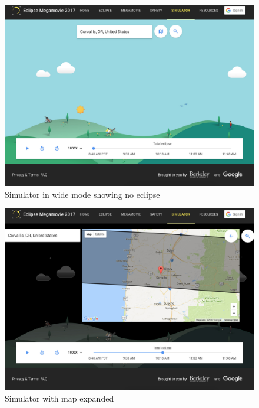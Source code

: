 \documentclass[10pt, onecolumn, draftclsnofoot, letterpaper, compsoc]{IEEEtran}
\begin{document}
\begin{figure}[!h]
	\begin{center}
			\includegraphics[width=\textwidth]{sim.eps}
		\caption{Simulator in wide mode showing no eclipse}
	\end{center}
\end{figure}
\newpage

\begin{figure}[!h]
	\begin{center}
			\includegraphics[width=\textwidth]{sim_map.eps}
		\caption{Simulator with map expanded}
	\end{center}
\end{figure}
\newpage
\end{document}
